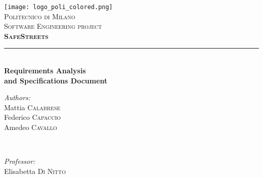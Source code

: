\begin{titlepage}
\newcommand{\HRule}{\rule{\linewidth}{0.5mm}} %

\center %
 
\texttt{[image: logo\_poli\_colored.png]}\\[0.5cm] %
\textsc{\LARGE Politecnico di Milano}\\[2cm] %
\textsc{\Large Software Engineering  project}\\[0.5cm] %
\textsc{\large \textbf{SafeStreets}}\\[1.5cm] %


\HRule \\[0.4cm]
\vspace{0.5cm}
{ \huge \bfseries Requirements Analysis\\ and Specifications Document}\\[0.4cm] %
\vspace{2cm}
 

\begin{minipage}{0.4\textwidth}
\begin{flushleft} \large
\emph{Authors:}\\
Mattia \textsc{Calabrese}\\
Federico \textsc{Capaccio}\\
Amedeo \textsc{Cavallo} %
\end{flushleft}
\end{minipage}
~
\begin{minipage}{0.4\textwidth}
\begin{flushright} \large
\emph{Professor:} \\
Elisabetta \textsc{Di Nitto} %
\end{flushright}
\end{minipage}\\[2cm]


\end{titlepage}
